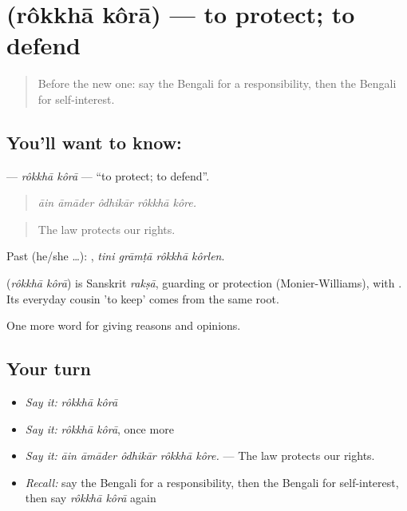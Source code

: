 \section[\texorpdfstring{\bn{রক্ষা} \bn{করা} (rôkkhā kôrā)}{রক্ষা করা (rôkkhā kôrā)}]{  (rôkkhā kôrā) — to protect; to defend}

\label{lesson:BN-C339-rokkha-kora}



\begin{quote}
Before the new one: say the Bengali for a responsibility, then the Bengali for self-interest.
\end{quote}

\subsection*{You'll want to know:  }
\textbf{ } — \emph{rôkkhā kôrā} — \textquotedblleft{}to protect; to defend\textquotedblright{}.

\begin{quote}
    
\end{quote}

\begin{quote}
\emph{āin āmāder ôdhikār rôkkhā kôre.}
\end{quote}

\begin{quote}
The law protects our rights.
\end{quote}

Past (he/she …):    , \emph{tini grāmṭā rôkkhā kôrlen}.

\begin{cousinweb}
\textbf{ } (\emph{rôkkhā kôrā}) is Sanskrit \emph{rakṣā}, guarding or protection (Monier-Williams), with . Its everyday cousin  'to keep' comes from the same root.
\end{cousinweb}

\begin{grammarlens}[title={What you've built}]
One more word for giving reasons and opinions.
\end{grammarlens}

\subsection*{Your turn}
\begin{itemize}
\raggedright
  \item \emph{Say it:} \emph{rôkkhā kôrā}
  \item \emph{Say it:} \emph{rôkkhā kôrā}, once more
  \item \emph{Say it:} \emph{āin āmāder ôdhikār rôkkhā kôre.} — The law protects our rights.
  \item \emph{Recall:} say the Bengali for a responsibility, then the Bengali for self-interest, then say \emph{rôkkhā kôrā} again
\end{itemize}

